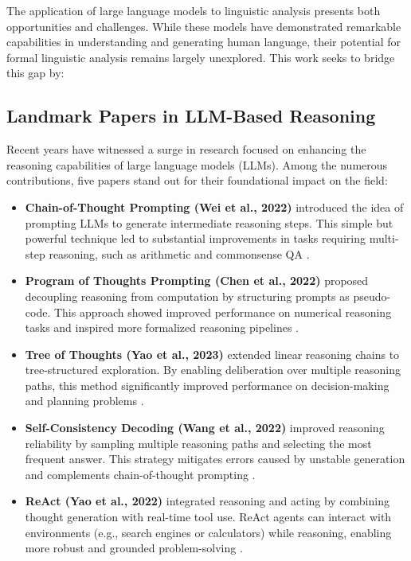 The application of large language models to linguistic analysis presents both opportunities and challenges. While these models have demonstrated remarkable capabilities in understanding and generating human language, their potential for formal linguistic analysis remains largely unexplored. This work seeks to bridge this gap by:
\subsection{Landmark Papers in LLM-Based Reasoning}

Recent years have witnessed a surge in research focused on enhancing the reasoning capabilities of large language models (LLMs). Among the numerous contributions, five papers stand out for their foundational impact on the field:

\begin{itemize}
    \item \textbf{Chain-of-Thought Prompting (Wei et al., 2022)} introduced the idea of prompting LLMs to generate intermediate reasoning steps. This simple but powerful technique led to substantial improvements in tasks requiring multi-step reasoning, such as arithmetic and commonsense QA \cite{wei2022chain}.

    \item \textbf{Program of Thoughts Prompting (Chen et al., 2022)} proposed decoupling reasoning from computation by structuring prompts as pseudo-code. This approach showed improved performance on numerical reasoning tasks and inspired more formalized reasoning pipelines \cite{chen2022program}.

    \item \textbf{Tree of Thoughts (Yao et al., 2023)} extended linear reasoning chains to tree-structured exploration. By enabling deliberation over multiple reasoning paths, this method significantly improved performance on decision-making and planning problems \cite{yao2023tree}.

    \item \textbf{Self-Consistency Decoding (Wang et al., 2022)} improved reasoning reliability by sampling multiple reasoning paths and selecting the most frequent answer. This strategy mitigates errors caused by unstable generation and complements chain-of-thought prompting \cite{wang2022self}.

    \item \textbf{ReAct (Yao et al., 2022)} integrated reasoning and acting by combining thought generation with real-time tool use. ReAct agents can interact with environments (e.g., search engines or calculators) while reasoning, enabling more robust and grounded problem-solving \cite{yao2022react}.
\end{itemize}

